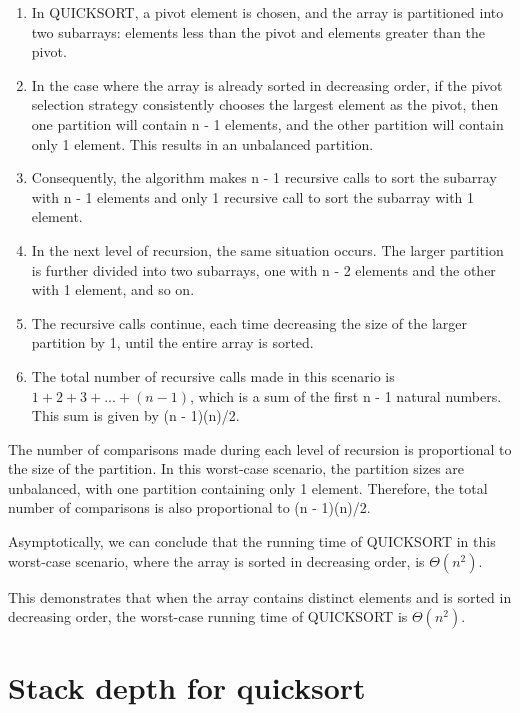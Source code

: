 \documentclass{article}
\begin{document}
\begin{enumerate}
  \item In QUICKSORT, a pivot element is chosen, and the array is partitioned into two subarrays: elements less than the pivot and elements greater than the pivot.

  \item In the case where the array is already sorted in decreasing order, if the pivot selection strategy consistently chooses the largest element as the pivot, then one partition will contain n - 1 elements, and the other partition will contain only 1 element. This results in an unbalanced partition.
  
  \item Consequently, the algorithm makes n - 1 recursive calls to sort the subarray with n - 1 elements and only 1 recursive call to sort the subarray with 1 element.
  
  \item In the next level of recursion, the same situation occurs. The larger partition is further divided into two subarrays, one with n - 2 elements and the other with 1 element, and so on.
  
  \item The recursive calls continue, each time decreasing the size of the larger partition by 1, until the entire array is sorted.
  
  \item The total number of recursive calls made in this scenario is $1 + 2 + 3 + ... + (n - 1)$, which is a sum of the first n - 1 natural numbers. This sum is given by (n - 1)(n)/2.
\end{enumerate}

The number of comparisons made during each level of recursion is proportional to the size of the partition. In this worst-case scenario, the partition sizes are unbalanced, with one partition containing only 1 element. Therefore, the total number of comparisons is also proportional to (n - 1)(n)/2.

Asymptotically, we can conclude that the running time of QUICKSORT in this worst-case scenario, where the array is sorted in decreasing order, is $\Theta(n^2)$.

This demonstrates that when the array contains distinct elements and is sorted in decreasing order, the worst-case running time of QUICKSORT is $\Theta(n^2)$.


  \section{Stack depth for quicksort}
\end{document}

